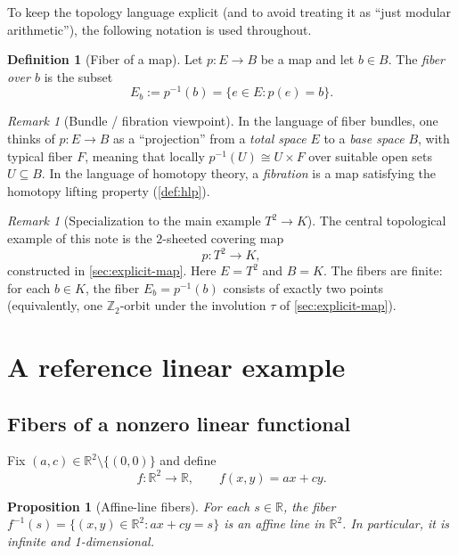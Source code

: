 \documentclass[11pt,a4paper]{article}
\newtheorem{proposition}[theorem]{Proposition}
\theoremstyle{definition}
\newtheorem{definition}[theorem]{Definition}
\theoremstyle{remark}
\newtheorem{remark}[theorem]{Remark}
\begin{document}
To keep the topology language explicit (and to avoid treating it as ``just modular arithmetic''), the following notation is used throughout.

\begin{definition}[Fiber of a map]
\label{def:fiber}
Let \(p:E\to B\) be a map and let \(b\in B\). The \emph{fiber over \(b\)} is the subset
\[
E_b := p^{-1}(b)=\{e\in E : p(e)=b\}.
\]
\end{definition}

\begin{remark}[Bundle / fibration viewpoint]
\label{rem:bundle-fibration-viewpoint}
In the language of fiber bundles, one thinks of \(p:E\to B\) as a ``projection'' from a \emph{total space} \(E\) to a \emph{base space} \(B\), with typical fiber \(F\), meaning that locally \(p^{-1}(U)\cong U\times F\) over suitable open sets \(U\subseteq B\). In the language of homotopy theory, a \emph{fibration} is a map satisfying the homotopy lifting property (\cref{def:hlp}).
\end{remark}

\begin{remark}[Specialization to the main example \(T^2\to K\)]
\label{rem:specialization-torus-klein}
The central topological example of this note is the \(2\)-sheeted covering map
\[
p:T^2\longrightarrow K,
\]
constructed in \cref{sec:explicit-map}. Here \(E=T^2\) and \(B=K\). The fibers are finite: for each \(b\in K\), the fiber \(E_b=p^{-1}(b)\) consists of exactly two points (equivalently, one \(\mathbb{Z}_2\)-orbit under the involution \(\tau\) of \cref{sec:explicit-map}).
\end{remark}

\section{A reference linear example}
\label{sec:linear}

\subsection{Fibers of a nonzero linear functional}
\label{sec:linear-fibers}

Fix \((a,c)\in \mathbb{R}^2\setminus\{(0,0)\}\) and define
\[
f:\mathbb{R}^2\to\mathbb{R},\qquad f(x,y)=ax+cy.
\]

\begin{proposition}[Affine-line fibers]
\label{prop:affine-line-fibers}
For each \(s\in \mathbb{R}\), the fiber \(f^{-1}(s)=\{(x,y)\in\mathbb{R}^2: ax+cy=s\}\) is an affine line in \(\mathbb{R}^2\). In particular, it is infinite and 1-dimensional.
\end{proposition}
\end{document}

